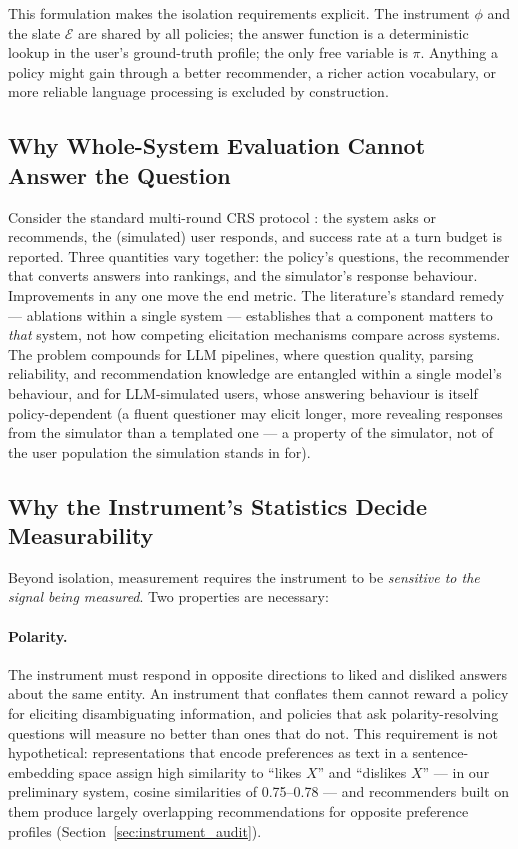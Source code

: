 \documentclass[11pt]{article}
\begin{document}
This formulation makes the isolation requirements explicit. The instrument
$\phi$ and the slate $\mathcal{E}$ are shared by all policies; the answer
function is a deterministic lookup in the user's ground-truth profile; the
only free variable is $\pi$. Anything a policy might gain through a better
recommender, a richer action vocabulary, or more reliable language
processing is excluded by construction.

\subsection{Why Whole-System Evaluation Cannot Answer the Question}

Consider the standard multi-round CRS protocol \citep{lei2020estimation}:
the system asks or recommends, the (simulated) user responds, and success
rate at a turn budget is reported. Three quantities vary together: the
policy's questions, the recommender that converts answers into rankings,
and the simulator's response behaviour. Improvements in any one move the
end metric. The literature's standard remedy --- ablations within a single
system --- establishes that a component matters to \emph{that} system, not
how competing elicitation mechanisms compare across systems. The problem
compounds for LLM pipelines, where question quality, parsing reliability,
and recommendation knowledge are entangled within a single model's
behaviour, and for LLM-simulated users, whose answering behaviour is itself
policy-dependent (a fluent questioner may elicit longer, more revealing
responses from the simulator than a templated one --- a property of the
simulator, not of the user population the simulation stands in for).

\subsection{Why the Instrument's Statistics Decide Measurability}
\label{sec:snr_theory}

Beyond isolation, measurement requires the instrument to be \emph{sensitive
to the signal being measured}. Two properties are necessary:

\paragraph{Polarity.} The instrument must respond in opposite directions to
\textsf{liked} and \textsf{disliked} answers about the same entity.
An instrument that conflates them cannot reward a policy for eliciting
disambiguating information, and policies that ask polarity-resolving
questions will measure no better than ones that do not. This requirement is
not hypothetical: representations that encode preferences as text in a
sentence-embedding space assign high similarity to ``likes $X$'' and
``dislikes $X$'' --- in our preliminary system, cosine similarities of
0.75--0.78 --- and recommenders built on them produce largely overlapping
recommendations for opposite preference profiles
(Section~\ref{sec:instrument_audit}).
\end{document}
